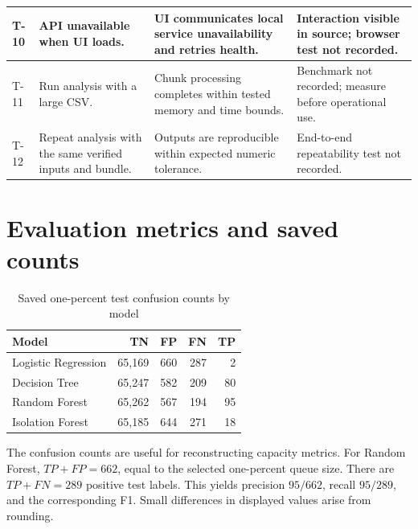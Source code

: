 \begin{longtable}{|p{}|p{}|p{}|p{}|}
T-10 & API unavailable when UI loads. & UI communicates local service unavailability and retries health. & Interaction visible in source; browser test not recorded.\\\hline
T-11 & Run analysis with a large CSV. & Chunk processing completes within tested memory and time bounds. & Benchmark not recorded; measure before operational use.\\\hline
T-12 & Repeat analysis with the same verified inputs and bundle. & Outputs are reproducible within expected numeric tolerance. & End-to-end repeatability test not recorded.\\\hline
\end{longtable}

\section{Evaluation metrics and saved counts}
\label{app:metrics}
\begin{table}[H]
\centering
\tablefont
\caption{Saved one-percent test confusion counts by model}
\label{tab:all-confusion}
\begin{tabularx}{\textwidth}{|p{}|R|R|R|R|}
\hline
\textbf{Model} & \textbf{TN} & \textbf{FP} & \textbf{FN} & \textbf{TP}\\\hline
Logistic Regression & 65,169 & 660 & 287 & 2\\\hline
Decision Tree & 65,247 & 582 & 209 & 80\\\hline
Random Forest & 65,262 & 567 & 194 & 95\\\hline
Isolation Forest & 65,185 & 644 & 271 & 18\\\hline
\end{tabularx}
\end{table}

The confusion counts are useful for reconstructing capacity metrics.
For Random Forest, \(TP+FP=662\), equal to the selected one-percent
queue size. There are \(TP+FN=289\) positive test labels. This yields
precision \(95/662\), recall \(95/289\), and the corresponding F1.
Small differences in displayed values arise from rounding.

